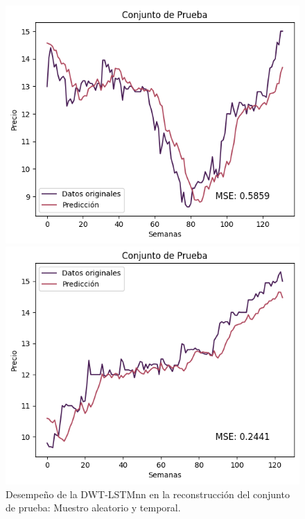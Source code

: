 \begin{figure}[H]
    \begin{minipage}{0.5\textwidth}
        \centering
        \includegraphics[width=\linewidth]{Figuras/proceso_de_entrenamiento/grafs_c_prueba/muestreo_aleatorio/DWT_LSTM/estandar/DWT_LSTM_rec.png}
    \end{minipage}
    \begin{minipage}{0.5\textwidth}
        \centering
        \includegraphics[width=\linewidth]{Figuras/proceso_de_entrenamiento/grafs_c_prueba/DWT_LSTM/estandar/DWT_LSTM_rec.png}
    \end{minipage}
    \caption{Desempeño de la DWT-LSTMnn en la reconstrucción del conjunto de prueba: Muestro aleatorio y temporal.} 
    \label{fig:c_prueba_DWTLSTM}
\end{figure}

